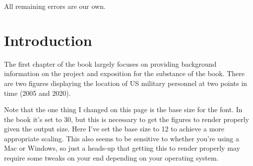 \documentclass[
]{book}
\theoremstyle{definition}
\theoremstyle{definition}
\theoremstyle{definition}
\theoremstyle{definition}
\theoremstyle{remark}
\begin{document}
All remaining errors are our own.

\hypertarget{introduction}{%
\chapter{Introduction}\label{introduction}}

The first chapter of the book largely focuses on providing background information on the project and exposition for the substance of the book. There are two figures displaying the location of US military personnel at two points in time (2005 and 2020).

Note that the one thing I changed on this page is the base size for the font. In the book it's set to 30, but this is necessary to get the figures to render properly given the output size. Here I've set the base size to 12 to achieve a more appropriate scaling. This also seems to be sensitive to whether you're using a Mac or Windows, so just a heads-up that getting this to render properly may require some tweaks on your end depending on your operating system.
\end{document}
